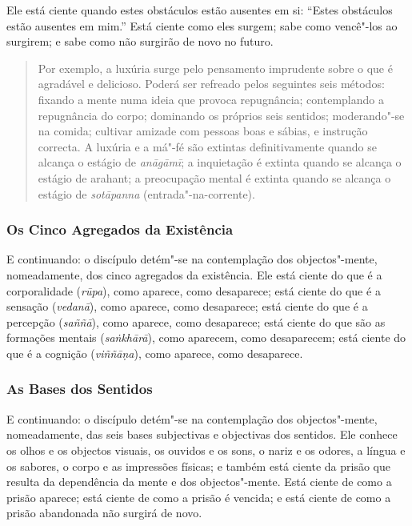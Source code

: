 Ele está ciente quando estes obstáculos estão ausentes em si: “Estes obstáculos
estão ausentes em mim.” Está ciente como eles surgem; sabe como vencê"-los ao
surgirem; e sabe como não surgirão de novo no futuro.


\begin{quote}
  Por exemplo, a luxúria surge pelo pensamento imprudente sobre o que é
  agradável e delicioso. Poderá ser refreado pelos seguintes seis métodos:
  fixando a mente numa ideia que provoca repugnância; contemplando a repugnância
  do corpo; dominando os próprios seis sentidos; moderando"-se na comida;
  cultivar amizade com pessoas boas e sábias, e instrução correcta. A luxúria e a
  má"-fé são extintas definitivamente quando se alcança o estágio de
  \emph{anāgāmī}; a inquietação é extinta quando se alcança o estágio de
  arahant; a preocupação mental é extinta quando se alcança o estágio de
  \emph{sotāpanna} (entrada"-na-corrente).
\end{quote}

\subsubsection{Os Cinco Agregados da Existência}


E continuando: o discípulo detém"-se na contemplação dos objectos"-mente,
nomeadamente, dos cinco agregados da existência. Ele está ciente do que é a
corporalidade (\emph{rūpa}), como aparece, como desaparece; está ciente do que é
a sensação (\emph{vedanā}), como aparece, como desaparece; está ciente do que é
a percepção (\emph{saññā}), como aparece, como desaparece; está ciente do que
são as formações mentais (\emph{saṅkhārā}), como aparecem, como desaparecem;
está ciente do que é a cognição (\emph{viññāṇa}), como aparece, como desaparece.

\subsubsection{As Bases dos Sentidos}


E continuando: o discípulo detém"-se na contemplação dos objectos"-mente,
nomeadamente, das seis bases subjectivas e objectivas dos sentidos. Ele conhece
os olhos e os objectos visuais, os ouvidos e os sons, o nariz e os odores, a
língua e os sabores, o corpo e as impressões físicas; e também está ciente da
prisão que resulta da dependência da mente e dos objectos"-mente.
Está ciente de como a prisão aparece; está ciente de como a prisão é vencida; e
está ciente de como a prisão abandonada não surgirá de novo.

